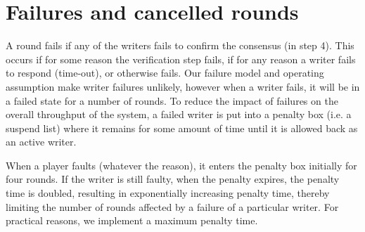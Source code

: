\documentclass[10pt]{article}
\begin{document}






\section{Failures and cancelled rounds}
\label{cancellation}
A round fails if any of the writers fails to confirm the consensus (in step 4). This occurs if for some reason the verification step fails, if for any reason a writer fails to respond (time-out), or otherwise fails. Our failure model and operating assumption make writer failures unlikely, however when a writer fails, it will be in a failed state for a number of rounds. To reduce the impact of failures on the overall throughput of the system, a failed writer is put into a penalty box (i.e. a suspend list) where it remains for some amount of time until it is allowed back as an active writer.



When a player faults (whatever the reason), it enters the penalty box initially for four rounds. If the writer is still faulty, when the penalty expires, the penalty time is doubled, resulting in exponentially increasing penalty time, thereby limiting the number of rounds affected by a failure of a particular writer. For practical reasons, we implement a maximum penalty time.


\end{document}
